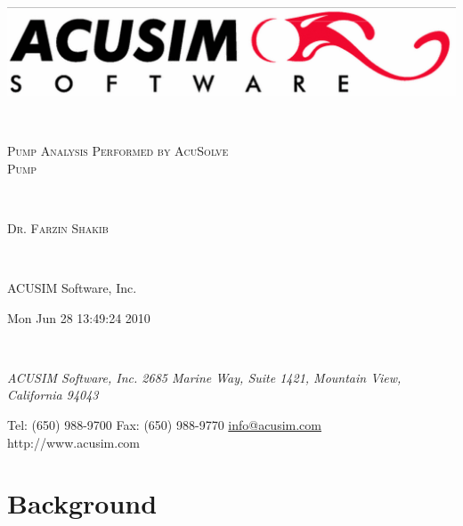 \documentclass[letterpaper,12pt]{article}
\begin{document}
\begin{center}
\includegraphics[scale=0.141998054627]{./Figures/AcusimLogo.png}
\end{center}
\vspace*{2.00mm}\hspace*{\fill}\\
\begin{center}
\Large{ \textsc{ Pump Analysis Performed by AcuSolve\\Pump }}\\
\end{center}
\vspace*{1.00mm}\hspace*{\fill}\\
\begin{center}
\large{ \textsc{ Dr. Farzin Shakib }}\\
\end{center}
\vspace*{1.00mm}\hspace*{\fill}\\
\begin{center}
ACUSIM Software, Inc.\\
\end{center}
\begin{center}
Mon Jun 28 13:49:24 2010\\
\end{center}
\vspace*{1.00mm}\hspace*{\fill}\\
\vfill
\begin{center}
\emph{ACUSIM Software, Inc. 2685 Marine Way, Suite 1421, Mountain View, California 94043}\\
\end{center}
\begin{center}
Tel: (650) 988-9700 Fax: (650) 988-9770 \href{mailto:info@acusim.com}{info@acusim.com} http://www.acusim.com\\
\end{center}
\vfill
\newpage
\clearpage
\tableofcontents
\vfill
\newpage
\clearpage
\section{Background}
\end{document}
